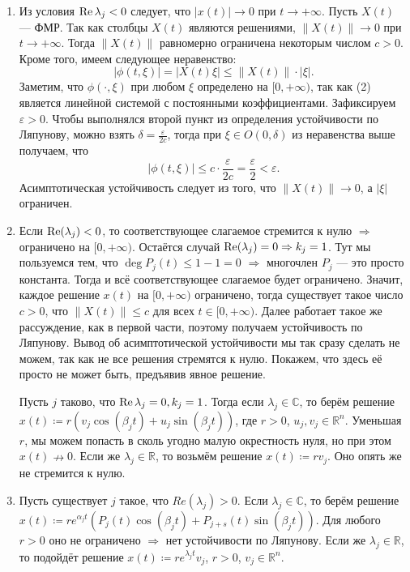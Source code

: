 \begin{enumerate}
\item Из условия $\operatorname{Re} \lambda_j < 0$ следует, что $|x(t)| \to 0$ при $t \to +\infty$. Пусть $X(t)$ --- ФМР. Так как столбцы $X(t)$ являются решениями, $\|X(t)\| \to 0$ при $t \to +\infty$.
Тогда $\|X(t)\|$ равномерно ограничена некоторым числом $c > 0$. Кроме того, имеем следующее неравенство:
\[
    |\phi(t, \xi)| = |X(t) \xi| \le \| X(t) \| \cdot |\xi|.
\]
Заметим, что $\phi(\cdot, \xi)$ при любом $\xi$ определено на $[0, +\infty)$, так как (2) является линейной системой с постоянными коэффициентами. Зафиксируем $\varepsilon > 0$. Чтобы выполнялся второй пункт из определения устойчивости по Ляпунову, можно взять $\delta = \frac{\varepsilon}{2c}$, тогда
при $\xi \in O(0, \delta)$ из неравенства выше получаем, что 
\[
    |\phi(t, \xi)| \leq c \cdot \frac{\varepsilon}{2c} = \frac{\varepsilon}{2} < \varepsilon.
\]
Асимптотическая устойчивость следует из того, что $\|X(t)\| \to 0$, а $|\xi|$ ограничен.

\item Если $\operatorname{Re}(\lambda_j) < 0$, то соответствующее слагаемое стремится к нулю $\Rightarrow$ ограничено на $[0, +\infty)$.
Остаётся случай $\operatorname{Re}(\lambda_j) = 0 \Rightarrow k_j = 1$. Тут мы пользуемся тем, что $\deg P_j(t) \le 1 - 1 = 0$ $\Rightarrow$ многочлен $P_j$ --- это просто константа. Тогда и всё соответствующее слагаемое будет ограничено.
Значит, каждое решение $x(t)$ на $[0, +\infty)$ ограничено, тогда существует такое число $c > 0$, что $\|X(t)\| \le c$ для всех $t \in [0, +\infty)$. Далее работает такое же рассуждение, как в первой части, поэтому получаем устойчивость по Ляпунову. Вывод об асимптотической устойчивости мы так сразу сделать не можем, так как не все решения стремятся к нулю. Покажем, что здесь её просто не может быть, предъявив явное решение.

Пусть $j$ таково, что $\operatorname{Re} \lambda_j = 0, k_j = 1$. Тогда если $\lambda_j \in \mathbb C$, то берём решение $x(t) \coloneq r(v_j \cos(\beta_j t) + u_j\sin(\beta_j t))$, где $r > 0$, $u_j, v_j \in \mathbb R^n$. Уменьшая $r$, мы можем попасть в сколь угодно малую окрестность нуля, но при этом $x(t) \nrightarrow 0$. Если же $\lambda_j \in \mathbb R$, то возьмём решение $x(t) \coloneq rv_j$. Оно опять же не стремится к нулю.

\item Пусть существует $j$ такое, что $Re(\lambda_j) > 0$. Если $\lambda_j \in \mathbb C$, то берём решение $x(t) \coloneq re^{\alpha_j t} (P_j(t)\cos(\beta_j t) + P_{j+s}(t)\sin(\beta_j t))$. Для любого $r > 0$ оно не ограничено $\Rightarrow$ нет устойчивости по Ляпунову.
Если же $\lambda_j \in \mathbb R$, то подойдёт решение $x(t) \coloneq r e^{\lambda_j t}v_j$, $r > 0$, $v_j \in \mathbb R^n$.


\end{enumerate}
